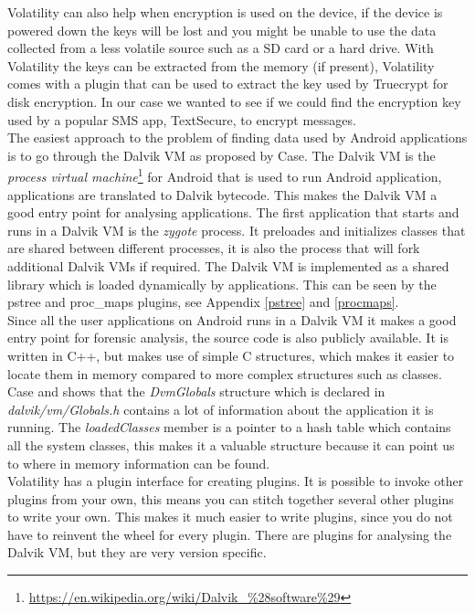   Volatility can also help when encryption is used on the device, if the device is
  powered down the keys will be lost and you might be unable to use the data 
  collected from a less volatile source such as a SD card or a hard drive. With
  Volatility the keys can be extracted from the memory (if present), Volatility 
  comes with a plugin that can be used to extract the key used by Truecrypt for 
  disk encryption. In our case we wanted to see if we could find the encryption
  key used by a popular SMS app, TextSecure, to encrypt messages.\\
  
  The easiest approach to the problem of finding data used by Android
  applications is to go through the Dalvik VM as proposed by Case\cite{case2011}.
  The Dalvik VM is the \textit{process virtual
  machine}\footnote{\url{https://en.wikipedia.org/wiki/Dalvik\_\%28software\%29}} for
  Android that is used to run Android application, applications are translated to
  Dalvik bytecode. This makes the Dalvik VM a good entry point for analysing
  applications. The first application that starts and runs in a Dalvik VM is the
  \textit{zygote} process. It preloades and initializes classes that are shared
  between different processes, it is also the process that will fork additional
  Dalvik VMs if required. The Dalvik VM is implemented as a shared library which
  is loaded dynamically by applications. This can be seen by the pstree and
  proc\_maps plugins, see Appendix \ref{pstree} and \ref{procmaps}. \\

  Since all the user applications on Android runs in a Dalvik VM it makes a good entry
  point for forensic analysis, the source code is also publicly available. It is
  written in C++, but makes use of simple C structures, which makes it easier to
  locate them in memory compared to more complex structures such as classes. Case
  and \cite{holger} shows that the \textit{DvmGlobals} structure which is
  declared in \textit{dalvik/vm/Globals.h} contains a lot of information about
  the application it is running. The \textit{loadedClasses} member is a pointer
  to a hash table which contains all the system classes, this makes it a
  valuable structure because it can point us to where in memory information can
  be found.\\

  Volatility has a plugin interface for creating plugins. It is possible to
  invoke other plugins from your own, this means you can stitch together
  several other plugins to write your own. This makes it much easier to write
  plugins, since you do not have to reinvent the wheel for every plugin. There
  are plugins for analysing the Dalvik VM, but they are very version specific.

